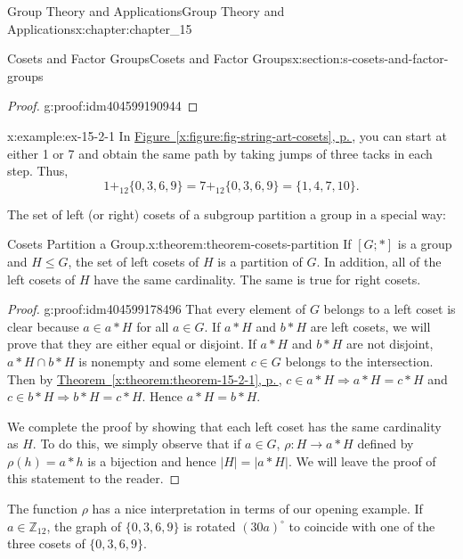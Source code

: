 \documentclass[twoside,10pt,]{book}
\newcommand{\xreffont}{\relax}
\numberwithin{equation}{section}
\begin{document}
\begin{chapterptx}{Group Theory and Applications}{}{Group Theory and Applications}{}{}{x:chapter:chapter_15}
\begin{sectionptx}{Cosets and Factor Groups}{}{Cosets and Factor Groups}{}{}{x:section:s-cosets-and-factor-groups}
\begin{proof}{}{g:proof:idm404599190944}
\end{proof}
\begin{example}{}{x:example:ex-15-2-1}%
In \hyperref[x:figure:fig-string-art-cosets]{Figure~{\xreffont\ref{x:figure:fig-string-art-cosets}}, p.\,\pageref{x:figure:fig-string-art-cosets}}, you can start at either 1 or 7 and obtain the same path by taking jumps of three tacks in each step. Thus,%
\begin{equation*}
1+_{12} \{0, 3, 6, 9\} = 7 +_{12} \{0, 3, 6, 9\} = \{1, 4, 7, 10\}.
\end{equation*}
%
\end{example}
The set of left (or right) cosets of a subgroup partition a group in a special way:%
\begin{theorem}{Cosets Partition a Group.}{}{x:theorem:theorem-cosets-partition}%
%
If \([G; *]\) is a group and \(H\leq  G\), the set of left cosets of \(H\) is a partition of \(G\). In addition, all of the left cosets of \(H\) have the same cardinality. The same is true for right cosets.%
\end{theorem}
\begin{proof}{}{g:proof:idm404599178496}
That every element of \(G\) belongs to a left coset is clear because \(a \in  a*H\) for all \(a \in  G\). If \(a*H\) and \(b*H\) are left cosets, we will prove that they are either equal or disjoint. If \(a*H\) and \(b*H\) are not disjoint, \(a*H\cap b*H\) is nonempty and some element \(c \in G\) belongs to the intersection. Then by \hyperref[x:theorem:theorem-15-2-1]{Theorem~{\xreffont\ref{x:theorem:theorem-15-2-1}}, p.\,\pageref{x:theorem:theorem-15-2-1}}, \(c\in a*H \Rightarrow  a*H = c*H\) and \(c \in b*H \Rightarrow  b*H = c*H\). Hence  \(a*H = b*H\).%
\par
We complete the proof by showing that each left coset has the same cardinality as \(H\). To do this, we simply observe that if \(a \in  G\), \(\rho:H \to  a*H\) defined by \(\rho(h)= a*h\) is a bijection and hence \(\lvert H\rvert =\lvert a *H\rvert\).  We will leave the proof of this statement to the reader.%
\end{proof}
The function \(\rho\) has a nice interpretation in terms of our opening example.  If \(a \in  \mathbb{Z}_{12}\), the graph of \(\{0, 3, 6, 9\}\) is rotated \((30a)^{\circ}\) to coincide with one of the three cosets of \(\{0, 3, 6, 9\}\).%
\end{sectionptx}
\end{chapterptx}
\end{document}
